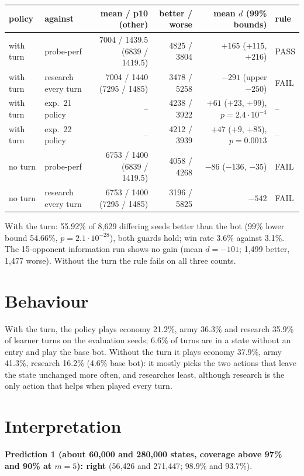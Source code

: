 \documentclass{../polyexp}
\begin{document}
\begin{center}\small
\begin{tabular}{llrrrl}
\toprule
policy & against & mean / p10 (other) & better / worse & mean $d$ (99\% bounds) & rule \\
\midrule
with turn & probe-perf          & 7004 / 1439.5 (6839 / 1419.5) & 4825 / 3804 & $+165$ ($+115$, $+216$) & PASS \\
with turn & research every turn & 7004 / 1440 (7295 / 1485)     & 3478 / 5258 & $-291$ (upper $-250$)    & FAIL \\
with turn & exp.\ 21 policy     & --                            & 4238 / 3922 & $+61$ ($+23$, $+99$), $p = 2.4\cdot10^{-4}$ & -- \\
with turn & exp.\ 22 policy     & --                            & 4212 / 3939 & $+47$ ($+9$, $+85$), $p = 0.0013$ & -- \\
no turn   & probe-perf          & 6753 / 1400 (6839 / 1419.5)   & 4058 / 4268 & $-86$ ($-136$, $-35$)    & FAIL \\
no turn   & research every turn & 6753 / 1400 (7295 / 1485)     & 3196 / 5825 & $-542$                   & FAIL \\
\bottomrule
\end{tabular}
\end{center}
With the turn: 55.92\% of 8{,}629 differing seeds better than the bot (99\% lower bound 54.66\%, $p = 2.1\cdot10^{-28}$),
both guards hold; win rate 3.6\% against 3.1\%. The 15-opponent information run shows no gain (mean $d = -101$;
1{,}499 better, 1{,}477 worse). Without the turn the rule fails on all three counts.

\section{Behaviour}
With the turn, the policy plays economy 21.2\%, army 36.3\% and research 35.9\% of learner turns on the evaluation
seeds; 6.6\% of turns are in a state without an entry and play the base bot. Without the turn it plays economy
37.9\%, army 41.3\%, research 16.2\% (4.6\% base bot): it mostly picks the two actions that leave the state unchanged
more often, and researches least, although research is the only action that helps when played every turn.

\section{Interpretation}
\textbf{Prediction 1 (about 60{,}000 and 280{,}000 states, coverage above 97\% and 90\% at $m=5$): right} (56{,}426
and 271{,}447; 98.9\% and 93.7\%).
\end{document}
